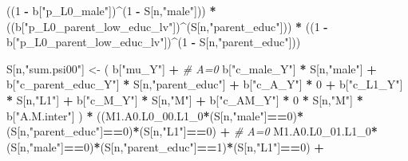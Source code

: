 \documentclass[
]{book}
\newenvironment{Shaded}{\begin{snugshade}}{\end{snugshade}}
\newcommand{\CommentTok}[1]{\textcolor[rgb]{0.56,0.35,0.01}{\textit{#1}}}
\newcommand{\DecValTok}[1]{\textcolor[rgb]{0.00,0.00,0.81}{#1}}
\newcommand{\NormalTok}[1]{#1}
\newcommand{\OtherTok}[1]{\textcolor[rgb]{0.56,0.35,0.01}{#1}}
\newcommand{\SpecialCharTok}[1]{\textcolor[rgb]{0.81,0.36,0.00}{\textbf{#1}}}
\newcommand{\StringTok}[1]{\textcolor[rgb]{0.31,0.60,0.02}{#1}}
\begin{document}
\begin{Shaded}
\begin{Highlighting}[]
\NormalTok{      ((}\DecValTok{1} \SpecialCharTok{{-}}\NormalTok{ b[}\StringTok{"p\_L0\_male"}\NormalTok{])}\SpecialCharTok{\^{}}\NormalTok{(}\DecValTok{1} \SpecialCharTok{{-}}\NormalTok{ S[n,}\StringTok{"male"}\NormalTok{])) }\SpecialCharTok{*} 
\NormalTok{      ((b[}\StringTok{"p\_L0\_parent\_low\_educ\_lv"}\NormalTok{])}\SpecialCharTok{\^{}}\NormalTok{(S[n,}\StringTok{"parent\_educ"}\NormalTok{])) }\SpecialCharTok{*}
\NormalTok{      ((}\DecValTok{1} \SpecialCharTok{{-}}\NormalTok{ b[}\StringTok{"p\_L0\_parent\_low\_educ\_lv"}\NormalTok{])}\SpecialCharTok{\^{}}\NormalTok{(}\DecValTok{1} \SpecialCharTok{{-}}\NormalTok{ S[n,}\StringTok{"parent\_educ"}\NormalTok{])) }
    
\NormalTok{    S[n,}\StringTok{"sum.psi00"}\NormalTok{] }\OtherTok{\textless{}{-}}\NormalTok{  ( b[}\StringTok{"mu\_Y"}\NormalTok{] }\SpecialCharTok{+}                                          \CommentTok{\# A=0}
\NormalTok{                             b[}\StringTok{"c\_male\_Y"}\NormalTok{] }\SpecialCharTok{*}\NormalTok{ S[n,}\StringTok{"male"}\NormalTok{] }\SpecialCharTok{+} 
\NormalTok{                             b[}\StringTok{"c\_parent\_educ\_Y"}\NormalTok{] }\SpecialCharTok{*}\NormalTok{ S[n,}\StringTok{"parent\_educ"}\NormalTok{] }\SpecialCharTok{+} 
\NormalTok{                             b[}\StringTok{"c\_A\_Y"}\NormalTok{] }\SpecialCharTok{*} \DecValTok{0} \SpecialCharTok{+} 
\NormalTok{                             b[}\StringTok{"c\_L1\_Y"}\NormalTok{] }\SpecialCharTok{*}\NormalTok{ S[n,}\StringTok{"L1"}\NormalTok{] }\SpecialCharTok{+}
\NormalTok{                             b[}\StringTok{"c\_M\_Y"}\NormalTok{] }\SpecialCharTok{*}\NormalTok{ S[n,}\StringTok{"M"}\NormalTok{] }\SpecialCharTok{+}
\NormalTok{                             b[}\StringTok{"c\_AM\_Y"}\NormalTok{] }\SpecialCharTok{*} \DecValTok{0} \SpecialCharTok{*}\NormalTok{ S[n,}\StringTok{"M"}\NormalTok{] }\SpecialCharTok{*}\NormalTok{ b[}\StringTok{"A.M.inter"}\NormalTok{] ) }\SpecialCharTok{*}
\NormalTok{      ((M1.A0.L0\_00.L1\_0}\SpecialCharTok{*}\NormalTok{(S[n,}\StringTok{"male"}\NormalTok{]}\SpecialCharTok{==}\DecValTok{0}\NormalTok{)}\SpecialCharTok{*}\NormalTok{(S[n,}\StringTok{"parent\_educ"}\NormalTok{]}\SpecialCharTok{==}\DecValTok{0}\NormalTok{)}\SpecialCharTok{*}\NormalTok{(S[n,}\StringTok{"L1"}\NormalTok{]}\SpecialCharTok{==}\DecValTok{0}\NormalTok{) }\SpecialCharTok{+} \CommentTok{\# A\textquotesingle{}=0}
\NormalTok{          M1.A0.L0\_01.L1\_0}\SpecialCharTok{*}\NormalTok{(S[n,}\StringTok{"male"}\NormalTok{]}\SpecialCharTok{==}\DecValTok{0}\NormalTok{)}\SpecialCharTok{*}\NormalTok{(S[n,}\StringTok{"parent\_educ"}\NormalTok{]}\SpecialCharTok{==}\DecValTok{1}\NormalTok{)}\SpecialCharTok{*}\NormalTok{(S[n,}\StringTok{"L1"}\NormalTok{]}\SpecialCharTok{==}\DecValTok{0}\NormalTok{) }\SpecialCharTok{+}

\end{Highlighting}
\end{Shaded}
\end{document}

